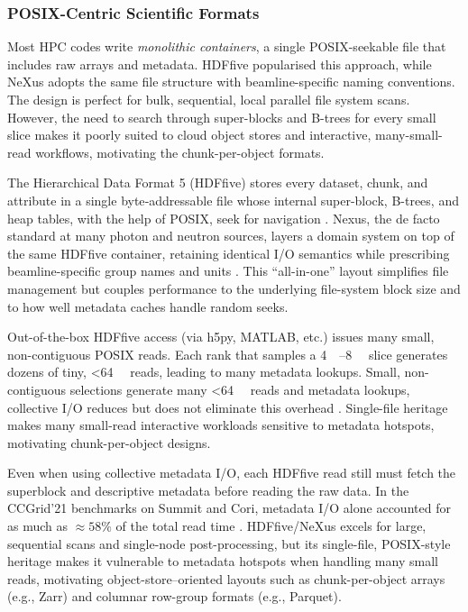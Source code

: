 \documentclass[nomenclature, english, bibtex]{kththesis}
\numberwithin{listing}{chapter}
\begin{document}
\subsubsection{\texorpdfstring{\gls{POSIX}-Centric Scientific Formats}{POSIX-Centric Scientific Formats}}
\label{sec:posix-centric-formats}
Most \gls{HPC} codes write \emph{monolithic containers}, a single \gls{POSIX}-seekable file that includes raw arrays and metadata. \gls{HDFfive} popularised this approach, while NeXus adopts the same file structure with beamline-specific naming conventions. The design is perfect for bulk, sequential, local parallel file system scans. However, the need to search through super-blocks and B-trees for every small slice makes it poorly suited to cloud object stores and interactive, many-small-read workflows, motivating the chunk-per-object formats.

The Hierarchical Data Format 5 (\gls{HDFfive}) stores every dataset, chunk, and attribute in a single byte‐addressable file whose internal super-block, B-trees, and heap tables, with the help of \gls{POSIX}, seek for navigation \cite{howison2010tuning}. Nexus, the de facto standard at many photon and neutron sources, layers a domain system on top of the same \gls{HDFfive} container, retaining identical I/O semantics while prescribing beamline-specific group names and units \cite{konnecke2015nexus}. This “all-in-one” layout simplifies file management but couples performance to the underlying file-system block size and to how well metadata caches handle random seeks.

Out-of-the-box \gls{HDFfive} access (via h5py, MATLAB, etc.) issues many small, non-contiguous \gls{POSIX} reads. Each rank that samples a \SIrange{4}{8}{\mega\byte} slice generates dozens of tiny, <\SI{64}{\kilo\byte} reads, leading to many metadata lookups. Small, non-contiguous selections generate many <\SI{64}{\kilo\byte} reads and metadata lookups, collective I/O reduces but does not eliminate this overhead \cite{Breitenfeld2022Parallel,9499420}. Single-file heritage makes many small-read interactive workloads sensitive to metadata hotspots, motivating chunk-per-object designs.

Even when using collective metadata I/O, each \gls{HDFfive} read still must fetch the superblock and descriptive metadata before reading the raw data. In the CCGrid’21 benchmarks on Summit and Cori, metadata I/O alone accounted for as much as $\approx 58\%$ of the total read time \cite{9499420}. \gls{HDFfive}/NeXus excels for large, sequential scans and single-node post-processing, but its single-file, \gls{POSIX}-style heritage makes it vulnerable to metadata hotspots when handling many small reads, motivating object-store–oriented layouts such as chunk-per-object arrays (e.g., Zarr) and columnar row-group formats (e.g., Parquet).
\end{document}
